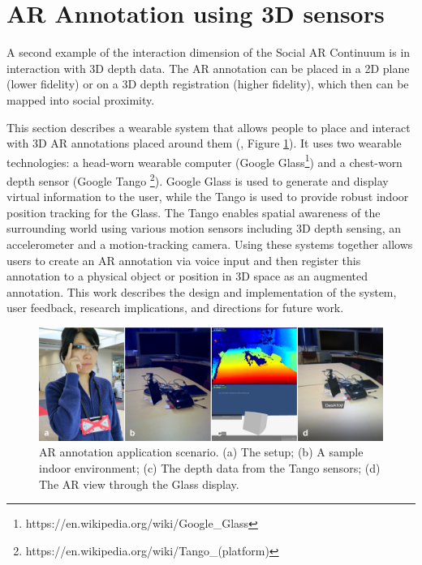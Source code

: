 \pagebreak
\section{AR Annotation using 3D sensors}
\label{sec:3D}

A second example of the interaction dimension of the Social AR Continuum is in interaction with 3D depth data. The AR annotation can be placed in a 2D plane (lower fidelity) or on a 3D depth registration (higher fidelity), which then can be mapped into social proximity. 

This section describes a wearable system that allows people to place and interact with 3D AR annotations placed around them (\cite{Nassani2015a, Nassani2015}, Figure \ref{fig:mgia15:teaser}). It uses two wearable technologies: a head-worn wearable computer (Google Glass\footnote{https://en.wikipedia.org/wiki/Google\_Glass}) and a chest-worn depth sensor (Google Tango \footnote{https://en.wikipedia.org/wiki/Tango\_(platform)}). Google Glass is used to generate and display virtual information to the user, while the Tango is used to provide robust indoor position tracking for the Glass. The Tango enables spatial awareness of the surrounding world using various motion sensors including 3D depth sensing, an accelerometer and a motion-tracking camera. Using these systems together allows users to create an AR annotation via voice input and then register this annotation to a physical object or position in 3D space as an augmented annotation. This work describes the design and implementation of the system, user feedback, research implications, and directions for future work.  

\begin{figure}[ht]
  \centering
  \includegraphics[width=\linewidth]{images/62-3d-mgia15/sampleteaser-01.jpg}
  \caption{AR annotation application scenario. (a) The setup; (b) A sample indoor environment; (c) The depth data from the Tango sensors; (d) The AR view through the Glass display.}
  \label{fig:mgia15:teaser}
\end{figure}

